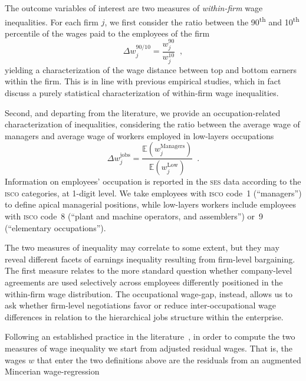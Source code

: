 \documentclass[12pt]{article}
\begin{document}
The outcome variables of interest are two measures of
\emph{within-firm} wage inequalities. For each firm $j$, we first
consider the ratio between the 90\textsuperscript{th} and
10\textsuperscript{th} percentile of the wages paid to the
employees of the firm
\begin{equation}
  \label{eq:def_disp_90_10}
  \Delta w^{90/10}_j=\dfrac{w^{90}_j}{w^{10}_j} \;\;,
\end{equation}
yielding a characterization of the wage distance between top and
bottom earners within the firm. This is in line with previous
empirical studies, which in fact discuss a purely statistical
characterization of within-firm wage inequalities.

Second, and departing from the literature, we provide an
occupation-related characterization of inequalities, considering the
ratio between the average wage of managers and average wage of workers employed in
low-layers occupations
\begin{equation} 
\label{eq:def_disp_jobs}
\Delta w^\mathrm{jobs}_j= \dfrac{\mathbb{E}\left(w^\mathrm{Managers}_j \right)}{\mathbb{E}\left(w^\mathrm{Low}_j \right)} \;\ .
\end{equation}
Information on employees' occupation is reported in the
\textsc{ses} data according to the \textsc{isco} categories, at
1-digit level. We take employees with \textsc{isco} code~1
(``managers'') to define apical managerial positions, while low-layers
workers include employees with \textsc{isco} code~8 (``plant and
machine operators, and assemblers'') or~9 (``elementary
occupations'').

The two measures of inequality may correlate to some extent, but they
may reveal different facets of earnings inequality resulting from
firm-level bargaining. The first measure relates to the more standard
question whether company-level agreements are used selectively across
employees differently positioned in the within-firm wage distribution.
The occupational wage-gap, instead, allows us to ask whether
firm-level negotiations favor or reduce inter-occupational wage
differences in relation to the hierarchical jobs structure within the
enterprise.

Following an established practice in the literature~\citep[at least
since][]{winter.ebmer.1999}, in order to compute the two measures of
wage inequality we start from adjusted residual wages. That is, the
wages $w$ that enter the two definitions above are the residuals from
an augmented Mincerian wage-regression
\end{document}
